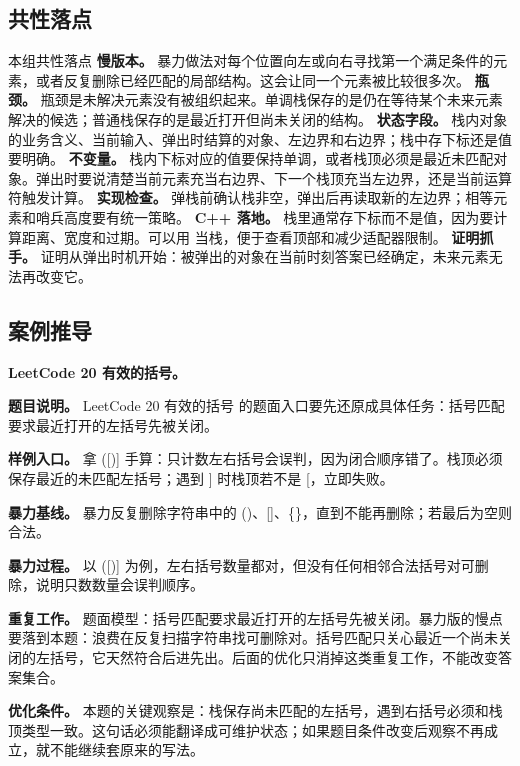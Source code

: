 \subsection{共性落点}

\begin{principlebox}{本组共性落点}
\textbf{慢版本。} 暴力做法对每个位置向左或向右寻找第一个满足条件的元素，或者反复删除已经匹配的局部结构。这会让同一个元素被比较很多次。
\textbf{瓶颈。} 瓶颈是未解决元素没有被组织起来。单调栈保存的是仍在等待某个未来元素解决的候选；普通栈保存的是最近打开但尚未关闭的结构。
\textbf{状态字段。} 栈内对象的业务含义、当前输入、弹出时结算的对象、左边界和右边界；栈中存下标还是值要明确。
\textbf{不变量。} 栈内下标对应的值要保持单调，或者栈顶必须是最近未匹配对象。弹出时要说清楚当前元素充当右边界、下一个栈顶充当左边界，还是当前运算符触发计算。
\textbf{实现检查。} 弹栈前确认栈非空，弹出后再读取新的左边界；相等元素和哨兵高度要有统一策略。
\textbf{C++ 落地。} 栈里通常存下标而不是值，因为要计算距离、宽度和过期。可以用  当栈，便于查看顶部和减少适配器限制。
\textbf{证明抓手。} 证明从弹出时机开始：被弹出的对象在当前时刻答案已经确定，未来元素无法再改变它。
\end{principlebox}

\subsection{案例推导}

\noindent\textbf{LeetCode 20 有效的括号。}

\textbf{题目说明。} LeetCode 20 有效的括号 的题面入口要先还原成具体任务：括号匹配要求最近打开的左括号先被关闭。

\textbf{样例入口。} 拿 ([)] 手算：只计数左右括号会误判，因为闭合顺序错了。栈顶必须保存最近的未匹配左括号；遇到 ] 时栈顶若不是 [，立即失败。

\textbf{暴力基线。} 暴力反复删除字符串中的 ()、[]、\{\}，直到不能再删除；若最后为空则合法。

\textbf{暴力过程。} 以 ([)] 为例，左右括号数量都对，但没有任何相邻合法括号对可删除，说明只数数量会误判顺序。

\textbf{重复工作。} 题面模型：括号匹配要求最近打开的左括号先被关闭。暴力版的慢点要落到本题：浪费在反复扫描字符串找可删除对。括号匹配只关心最近一个尚未关闭的左括号，它天然符合后进先出。后面的优化只消掉这类重复工作，不能改变答案集合。

\textbf{优化条件。} 本题的关键观察是：栈保存尚未匹配的左括号，遇到右括号必须和栈顶类型一致。这句话必须能翻译成可维护状态；如果题目条件改变后观察不再成立，就不能继续套原来的写法。

